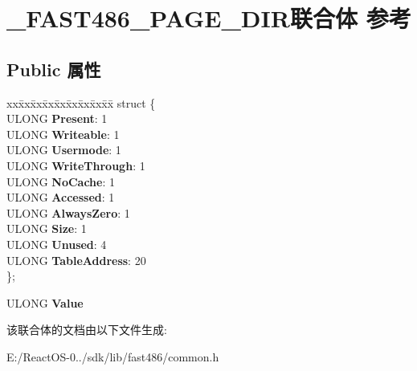 \hypertarget{union___f_a_s_t486___p_a_g_e___d_i_r}{}\section{\+\_\+\+F\+A\+S\+T486\+\_\+\+P\+A\+G\+E\+\_\+\+D\+I\+R联合体 参考}
\label{union___f_a_s_t486___p_a_g_e___d_i_r}
\subsection*{Public 属性}
\begin{DoxyCompactItemize}
\item 
\mbox{\label{union___f_a_s_t486___p_a_g_e___d_i_r_a6e268491f1900144dfcf8ddf2098150a}} 
\begin{tabbing}
xx\=xx\=xx\=xx\=xx\=xx\=xx\=xx\=xx\=\kill
struct \{\\
\>ULONG {\bfseries Present}: 1\\
\>ULONG {\bfseries Writeable}: 1\\
\>ULONG {\bfseries Usermode}: 1\\
\>ULONG {\bfseries WriteThrough}: 1\\
\>ULONG {\bfseries NoCache}: 1\\
\>ULONG {\bfseries Accessed}: 1\\
\>ULONG {\bfseries AlwaysZero}: 1\\
\>ULONG {\bfseries Size}: 1\\
\>ULONG {\bfseries Unused}: 4\\
\>ULONG {\bfseries TableAddress}: 20\\
\}; \\

\end{tabbing}\item 
\mbox{\label{union___f_a_s_t486___p_a_g_e___d_i_r_afec95974dd9eb02b068515dcd8ad7174}} 
U\+L\+O\+NG {\bfseries Value}
\end{DoxyCompactItemize}


该联合体的文档由以下文件生成\+:\begin{DoxyCompactItemize}
\item 
E\+:/\+React\+O\+S-\/0../sdk/lib/fast486/common.\+h\end{DoxyCompactItemize}
